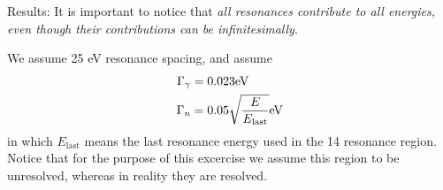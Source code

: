 \documentclass{school-22.211-notes}
\begin{document}
Results: It is important to notice that \textit{all resonances contribute to all energies, even though their contributions can be infinitesimally}. 

We assume 25 eV resonance spacing, and assume
\begin{align}
\Gamma_{\gamma} &= 0.023 \mathrm{eV} \\
\Gamma_{n} &= 0.05 \sqrt{\frac{E}{E_{\mathrm{last}}}}  \mathrm{eV}
\end{align}
in which $E_{\mathrm{last}}$ means the last resonance energy used in the 14 resonance region. Notice that for the purpose of this excercise we assume this region to be unresolved, whereas in reality they are resolved. 
\end{document}
